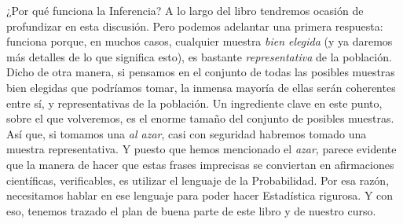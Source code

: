 ¿Por qué funciona la Inferencia? A lo largo del libro tendremos ocasión de profundizar en esta
discusión. Pero podemos adelantar una primera respuesta: funciona porque, en muchos casos,
cualquier muestra {\em bien elegida} (y ya daremos más detalles de lo que significa esto), es
bastante {\em representativa} de la población. Dicho de otra manera, si pensamos en el conjunto de
todas las posibles muestras bien elegidas que podríamos tomar, la inmensa mayoría de ellas serán
coherentes entre sí, y representativas de la población. Un ingrediente clave en este punto, sobre
el que volveremos, es el enorme tamaño del conjunto de posibles muestras. Así que, si tomamos una
{\em al azar}, casi con seguridad habremos tomado una muestra representativa. Y puesto que hemos
mencionado el {\em azar}, parece evidente que la manera de hacer que estas frases imprecisas se
conviertan en afirmaciones científicas, verificables, es utilizar el lenguaje de la {\sf
Probabilidad}. Por esa razón, necesitamos hablar en ese lenguaje para poder hacer Estadística
rigurosa. Y con eso, tenemos trazado el plan de buena parte de este libro y de nuestro curso.
